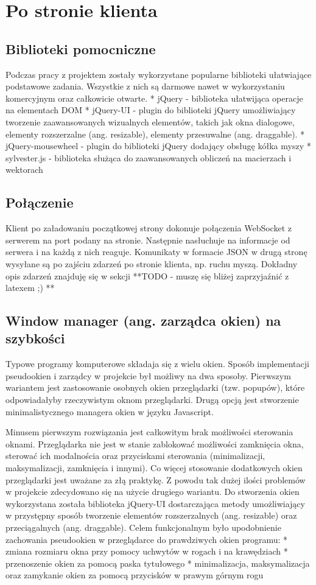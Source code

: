 \documentclass[polish]{inz}
\begin{document}
\section{Po stronie klienta}

\subsection{Biblioteki pomocniczne}
Podczas pracy z projektem zostały wykorzystane popularne biblioteki ułatwiające podstawowe zadania. Wszystkie z nich są darmowe nawet w wykorzystaniu komercyjnym oraz całkowicie otwarte.
* jQuery - biblioteka ułatwijąca operacje na elementach DOM
* jQuery-UI - plugin do biblioteki jQuery umożliwiający tworzenie zaawansowanych wizualnych elementów, takich jak okna dialogowe, elementy rozszerzalne (ang. resizable), elementy przesuwalne (ang. draggable).
* jQuery-mousewheel - plugin do biblioteki jQuery dodający obsługę kółka myszy
* sylvester.js - biblioteka służąca do zaawansowanych obliczeń na macierzach i wektorach

\subsection{Połączenie}
Klient po załadowaniu początkowej strony dokonuje połączenia WebSocket z serwerem na port podany na stronie. Następnie nasłuchuje na informacje od serwera i na każdą z nich reaguje. Komunikaty w formacie JSON w drugą stronę wysyłane są po zajściu zdarzeń po stronie klienta, np. ruchu myszą. Dokładny opis zdarzeń znajduję się w sekcji **TODO - muszę się bliżej zaprzyjaźnić z latexem ;) **

\subsection{Window manager (ang. zarządca okien) na szybkości}
Typowe programy komputerowe składaja się z wielu okien. Sposób implementacji pseudookien i zarządcy w projekcie był możliwy na dwa sposoby.
Pierwszym wariantem jest zastosowanie osobnych okien przeglądarki (tzw. popupów), które odpowiadałyby rzeczywistym oknom przeglądarki.
Drugą opcją jest stworzenie minimalistycznego managera okien w języku Javascript.

Minusem pierwszym rozwiązania jest całkowitym brak możliwości sterowania oknami. Przeglądarka nie jest w stanie zablokować możliwości zamknięcia okna, sterować ich modalnościa oraz przyciskami sterowania (minimalizacji, maksymalizacji, zamknięcia i innymi). Co więcej stosowanie dodatkowych okien przeglądarki jest uważane za złą praktykę.
Z powodu tak dużej ilości problemów w projekcie zdecydowano się na użycie drugiego wariantu. Do stworzenia okien wykorzystana została biblioteka jQuery-UI dostarczająca metody umożliwiający w przystępny sposób tworzenie elementów rozszerzalnych (ang. resizable) oraz przeciągalnych (ang. draggable). Celem funkcjonalnym było upodobnienie zachowania pseudookien w przeglądarce do prawdziwych okien programu:
* zmiana rozmiaru okna przy pomocy uchwytów w rogach i na krawędziach
* przenoszenie okien za pomocą paska tytułowego
* minimalizacja, maksymalizacja oraz zamykanie okien za pomocą przycisków w prawym górnym rogu
\end{document}

